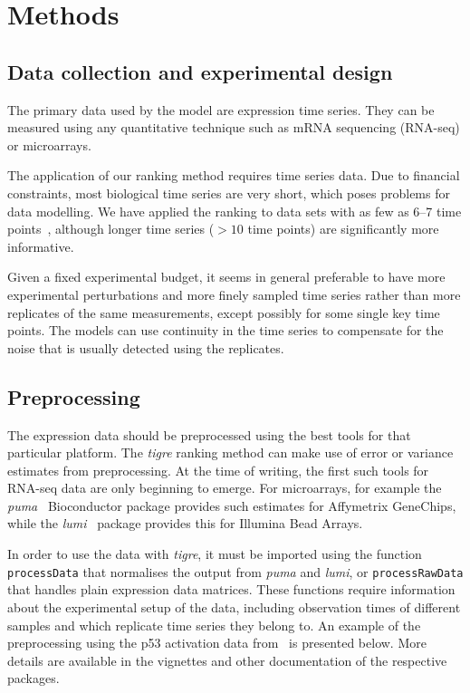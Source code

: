 \documentclass[11pt]{article}
\newcommand{\Rpackage}[1]{\emph{#1}}
\newcommand{\tigre}[0]{\Rpackage{tigre}}
\begin{document}
\section{Methods}

\subsection{Data collection and experimental design}

The primary data used by the model are expression time series.  They
can be measured using any quantitative technique such as mRNA
sequencing (RNA-seq) or microarrays.

The application of our ranking method requires time series data.  Due
to financial constraints, most biological time series are very short,
which poses problems for data modelling.  We have applied the ranking
to data sets with as few as 6--7 time
points~\cite{Honkela2010MLSP,Honkela2010PNAS}, although longer time
series ($> 10$ time points) are significantly more informative.

Given a fixed experimental budget, it seems in general preferable to
have more experimental perturbations and more finely sampled time
series rather than more replicates of the same measurements, except
possibly for some single key time points.  The models can use
continuity in the time series to compensate for the noise that is
usually detected using the replicates.

\subsection{Preprocessing}

The expression data should be preprocessed using the best tools for
that particular platform.  The \tigre{} ranking method can make use of
error or variance estimates from preprocessing.  At the time of
writing, the first such tools for RNA-seq data are only beginning to emerge.  For microarrays, for example the
\Rpackage{puma}~\cite{Pearson2009} Bioconductor package provides such
estimates for Affymetrix GeneChips, while the
\Rpackage{lumi}~\cite{Du2008} package provides this for Illumina Bead
Arrays.

In order to use the data with \tigre{}, it must be imported using the
function \texttt{processData} that normalises the output from
\Rpackage{puma} and \Rpackage{lumi}, or \texttt{processRawData} that
handles plain expression data matrices.  These functions require
information about the experimental setup of the data, including
observation times of different samples and which replicate time series
they belong to.  An example of the preprocessing using the p53
activation data from~\cite{Barenco2006a} is presented below.  More
details are available in the vignettes and other documentation of the
respective packages.
\end{document}

